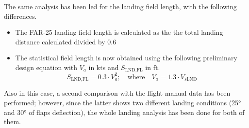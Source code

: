 %
\clearpage
%
\noindent
The same analysis has been led for the landing field length, with the following differences.
%
\begin{itemize}
\item The \gls{FAR}-25 landing field length is calculated as the the total landing distance calculated divided by 0.6 
\item The statistical field length is now obtained using the following preliminary design equation with $V_a$ in kts and $S_{\text{LND,FL}}$ in ft.
	\begin{equation}
		S_{\text{LND,FL}}=0.3\cdot V_{a}^2; \quad \text{where} \quad V_a=1.3\cdot V_{s\text{LND}}
	\end{equation}
\end{itemize}
%
Also in this case, a second comparison with the flight manual data has been performed; however, since the latter shows two different landing conditions (25° and 30° of flaps deflection), the whole landing analysis has been done for both of them.
%
\begin{table}[htbp]
  \centering
  \caption{Landing sensibility analysis results with $\delta_{\text{flap}}=\SI{30}{\degree}$}
  \label{tab:LandExcel2p55}
\end{table}
